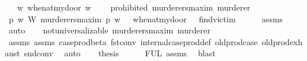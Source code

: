 \begin{isabellebody}
%
\isanewline
\ \ \ {\isachardoublequoteopen}{\isasymforall}w{\isachardot}\ when{\isacharunderscore}at{\isacharunderscore}my{\isacharunderscore}door\ w{\isachardoublequoteclose}\isanewline
%
\isanewline
\ \ \ {\isachardoublequoteopen}{\isasymTurnstile}\ {\isacharparenleft}prohibited\ murderers{\isacharunderscore}maxim\ murderer{\isacharparenright}{\isachardoublequoteclose}\isanewline
%
\isadelimproof
%
\endisadelimproof
%
\isatagproof
{}\isamarkupfalse%
\ {\isacharminus}\ \isanewline
\ \ \isamarkupfalse%
\ {\isachardoublequoteopen}{\isacharparenleft}{\isasymforall}p\ w{\isachardot}\ {\isacharparenleft}W\ murderers{\isacharunderscore}maxim\ p{\isacharparenright}\ w{\isacharparenright}\ {\isasymlongrightarrow}\ {\isacharparenleft}{\isasymTurnstile}\ {\isacharparenleft}when{\isacharunderscore}at{\isacharunderscore}my{\isacharunderscore}door\ \isactrlbold {\isasymrightarrow}\ {\isacharparenleft}\isactrlbold {\isasymnot}\ find{\isacharunderscore}victim{\isacharparenright}{\isacharparenright}{\isacharparenright}{\isachardoublequoteclose}\isanewline
\ \ \ \ \isamarkupfalse%
\ assms{\isacharparenleft}{}{\isacharparenright}\ \isamarkupfalse%
\ auto\isanewline
\ \ \isamarkupfalse%
\ {\isachardoublequoteopen}not{\isacharunderscore}universalizable\ murderers{\isacharunderscore}maxim\ murderer{\isachardoublequoteclose}\isanewline
\ \ \ \ \isamarkupfalse%
\ assms{\isacharparenleft}{}{\isacharparenright}\ assms{\isacharparenleft}{}{\isacharparenright}\ case{\isacharunderscore}prod{\isacharunderscore}beta\ fst{\isacharunderscore}conv\ internal{\isacharunderscore}case{\isacharunderscore}prod{\isacharunderscore}def\ old{\isachardot}prod{\isachardot}case\ old{\isachardot}prod{\isachardot}exhaust\ snd{\isacharunderscore}conv\ \isamarkupfalse%
\ auto\isanewline
\ \ \isamarkupfalse%
\ {\isacharquery}thesis\isanewline
\ \ \ \ \isamarkupfalse%
\ FUL\ assms{\isacharparenleft}{}{\isacharparenright}\ \isamarkupfalse%
\ blast\ \isanewline
{}\isamarkupfalse%
%
\endisatagproof
{\isafoldproof}%
%
\isadelimproof
%
\endisadelimproof
%
\begin{isamarkuptext}%

\end{isamarkuptext}
\end{isabellebody}
